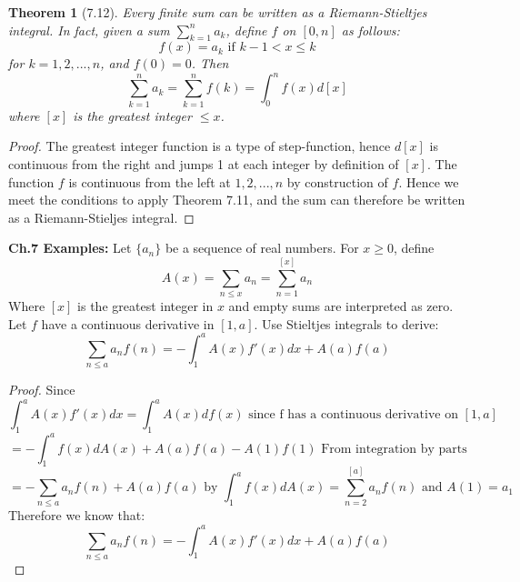 \documentclass[aps,pra,notitlepage,amsmath,amssymb,letterpaper,12pt]{revtex4-1}
\newtheorem{theorem}{Theorem}
\begin{document}
\begin{theorem}[7.12]
Every finite sum can be written as a Riemann-Stieltjes integral. In fact, given a sum $\sum_{k=1}^{n} a_{k}$, define $f$ on $[0,n]$ as follows:
\[f(x) = a_{k}  \textrm{  if  }  k-1 < x \leq k\]
for $k=1,2,...,n$, and $f(0) = 0$. Then
\[\sum_{k=1}^{n}a_{k} = \sum_{k=1}^{n}f(k) = \int_{0}^{n}f(x)d[x]\]
where $[x]$ is the greatest integer $\leq x$.
\end{theorem}
\begin{proof}
The greatest integer function is a type of step-function, hence $d[x]$ is continuous from the right and jumps 1 at each integer by definition of $[x]$. The function $f$ is continuous from the left at $1,2,...,n$ by construction of $f$. Hence we meet the conditions to apply Theorem 7.11, and the sum can therefore be written as a Riemann-Stieljes integral.
\newline{}
\end{proof}
\textbf{Ch.7 Examples:} \newline{}
Let $\{a_n\}$ be a sequence of real numbers. For $x\geq 0$, define $$A(x) = \sum_{n\leq x}a_n = \sum_{n=1}^{[x]}a_n$$
Where $[x]$ is the greatest integer in $x$ and empty sums are interpreted as zero.  Let $f$ have a continuous derivative in $[1,a]$. Use Stieltjes integrals to derive: $$\sum_{n\leq a}a_nf(n) = -\int_{1}^{a}A(x)f'(x)dx + A(a)f(a)$$
\begin{proof} Since $$\int_{1}^{a}A(x)f'(x)dx=\int_{1}^{a}A(x)df(x) \textrm{ since f has a continuous derivative on } [1, a]$$
$$= - \int_{1}^{a}f(x)dA(x)+A(a)f(a)-A(1)f(1) \textrm{ From integration by parts }$$
$$= - \sum_{n\leq a}a_nf(n)+A(a)f(a) \textrm{ by } \int_{1}^{a}f(x)dA(x)=\sum_{n=2}^{[a]}a_nf(n) \textrm{ and } A(1)=a_1$$
Therefore we know that: $$\sum_{n\leq a}a_nf(n) = -\int_{1}^{a}A(x)f'(x)dx + A(a)f(a)$$
\end{proof}
\end{document}
